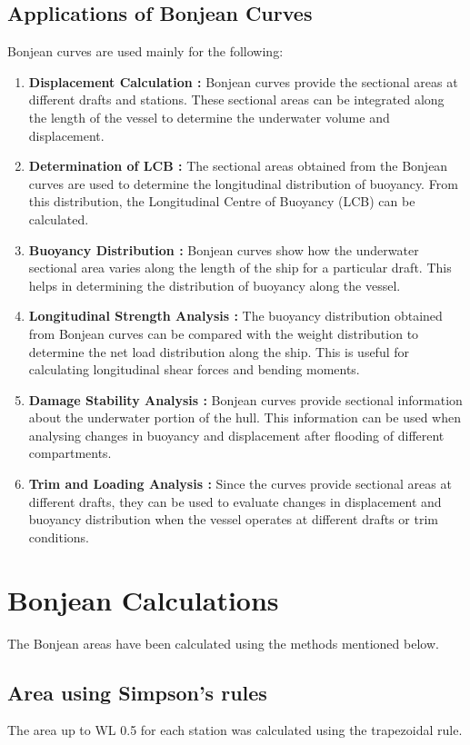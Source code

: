 \documentclass[12pt,a4paper,twoside]{report}
\begin{document}
\subsection{Applications of Bonjean Curves}
Bonjean curves are used mainly for the following:
\begin{enumerate}[\alph*)]
    \item \textbf{Displacement Calculation : }Bonjean curves provide the sectional areas at different drafts and stations. These sectional areas can be integrated along the length of the vessel to determine the underwater volume and displacement.
    \item \textbf{Determination of LCB : }The sectional areas obtained from the Bonjean curves are used to determine the longitudinal distribution of buoyancy. From this distribution, the Longitudinal Centre of Buoyancy (LCB) can be calculated.
    \item \textbf{Buoyancy Distribution : }Bonjean curves show how the underwater sectional area varies along the length of the ship for a particular draft. This helps in determining the distribution of buoyancy along the vessel.
    \item \textbf{Longitudinal Strength Analysis : }The buoyancy distribution obtained from Bonjean curves can be compared with the weight distribution to determine the net load distribution along the ship. This is useful for calculating longitudinal shear forces and bending moments.
    \item \textbf{Damage Stability Analysis : }Bonjean curves provide sectional information about the underwater portion of the hull. This information can be used when analysing changes in buoyancy and displacement after flooding of different compartments.
    \item \textbf{Trim and Loading Analysis : }Since the curves provide sectional areas at different drafts, they can be used to evaluate changes in displacement and buoyancy distribution when the vessel operates at different drafts or trim conditions.
\end{enumerate}

\section{Bonjean Calculations}
The Bonjean areas have been calculated using the methods mentioned below.    
\subsection{Area using Simpson's rules}
The area up to WL 0.5 for each station was calculated using the
trapezoidal rule.
\end{document}
